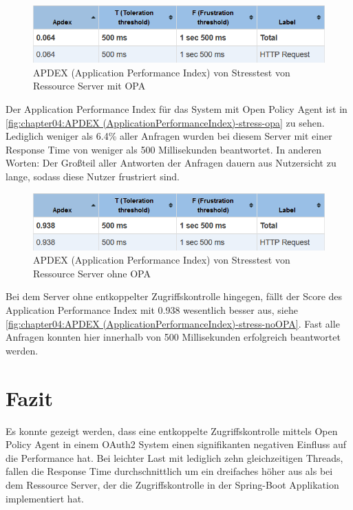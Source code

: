 \begin{figure}[H]
  \centering
  \includegraphics[width=1.0\textwidth]{gfx/APDEX (Application Performance Index)-stress-opa.png}
  \caption{APDEX (Application Performance Index) von Stresstest von Ressource Server mit OPA}
  \label{fig:chapter04:APDEX (ApplicationPerformanceIndex)-stress-opa}
\end{figure}

Der Application Performance Index für das System mit Open Policy Agent ist in \autoref{fig:chapter04:APDEX (ApplicationPerformanceIndex)-stress-opa} zu sehen. Lediglich weniger als 6.4\% aller Anfragen wurden bei diesem Server mit einer Response Time von weniger als 500 Millisekunden beantwortet. In anderen Worten: Der Großteil aller Antworten der Anfragen dauern aus Nutzersicht zu lange, sodass diese Nutzer frustriert sind.

\begin{figure}[H]
  \centering
  \includegraphics[width=1.0\textwidth]{gfx/APDEX (Application Performance Index)-stress-noOPA.png}
  \caption{APDEX (Application Performance Index) von Stresstest von Ressource Server ohne OPA}
  \label{fig:chapter04:APDEX (ApplicationPerformanceIndex)-stress-noOPA}
\end{figure}

Bei dem Server ohne entkoppelter Zugriffskontrolle hingegen, fällt der Score des Application Performance Index mit 0.938 wesentlich besser aus, siehe \autoref{fig:chapter04:APDEX (ApplicationPerformanceIndex)-stress-noOPA}. Fast alle Anfragen konnten hier innerhalb von 500 Millisekunden erfolgreich beantwortet werden. 

\section{Fazit}
Es konnte gezeigt werden, dass eine entkoppelte Zugriffskontrolle mittels Open Policy Agent in einem OAuth2 System einen signifikanten negativen Einfluss auf die Performance hat. Bei leichter Last mit lediglich zehn gleichzeitigen Threads, fallen die Response Time durchschnittlich um ein dreifaches höher aus als bei dem Ressource Server, der die Zugriffskontrolle in der Spring-Boot Applikation implementiert hat.\smallskip

